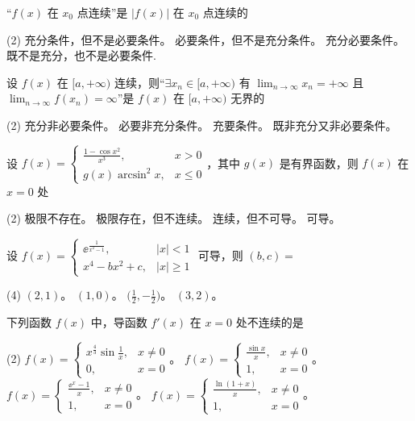 \begin{ti}
	“$f(x)$ 在 $x_0$ 点连续”是 $|f(x)|$ 在 $x_0$ 点连续的
	\begin{tasks}(2)
		\task 充分条件，但不是必要条件。
		\task 必要条件，但不是充分条件。
		\task 充分必要条件。
		\task 既不是充分，也不是必要条件.
	\end{tasks}
\end{ti}

\begin{ti}
	设 $f(x)$ 在 $[a,+\infty)$ 连续，则“$\exists x_n \in [a,+\infty)$ 有 $\lim_{n \to \infty}x_n = +\infty$ 且 $\lim_{n \to \infty}f(x_n) = \infty$”是 $f(x)$ 在 $[a,+\infty)$ 无界的
	\begin{tasks}(2)
		\task 充分非必要条件。
		\task 必要非充分条件。
		\task 充要条件。
		\task 既非充分又非必要条件。
	\end{tasks}
\end{ti}

\begin{ti}
	设 $f(x) = \begin{cases}
		\frac{1-\cos x^2}{x^3}, & x > 0 \\
		g(x) \arcsin^2x, & x \leq 0
	\end{cases}$，其中 $g(x)$ 是有界函数，则 $f(x)$ 在 $x=0$ 处
	\begin{tasks}(2)
		\task 极限不存在。
		\task 极限存在，但不连续。
		\task 连续，但不可导。
		\task 可导。
	\end{tasks}
\end{ti}

\begin{ti}
	设 $f(x) = \begin{cases}
		\ee^{\frac{1}{x^2-1}}, & |x|<1 \\
		x^4 - bx^2 + c, & |x| \geq 1
	\end{cases}$ 可导，则 $(b,c) = $
	\begin{tasks}(4)
		\task $(2,1)$。
		\task $(1,0)$。
		\task $\biggl(\frac{1}{2},-\frac{1}{2}\biggr)$。
		\task $(3,2)$。
	\end{tasks}
\end{ti}

\begin{ti}
	下列函数 $f(x)$ 中，导函数 $f'(x)$ 在 $x=0$ 处不连续的是
	\begin{tasks}(2)
		\task $f(x) = \begin{cases}
			x^{\frac43} \sin \frac{1}{x}, & x \ne 0 \\
			0, & x = 0
		\end{cases}$。
		\task $f(x) = \begin{cases}
			\frac{\sin x}{x}, & x \ne 0 \\
			1, & x = 0
		\end{cases}$。
		\task $f(x) = \begin{cases}
			\frac{\ee^x-1}{x}, & x \ne 0 \\
			1, & x = 0
		\end{cases}$。
		\task $f(x) = \begin{cases}
			\frac{\ln(1+x)}{x}, & x \ne 0 \\
			1, & x = 0
		\end{cases}$。
	\end{tasks}
\end{ti}

